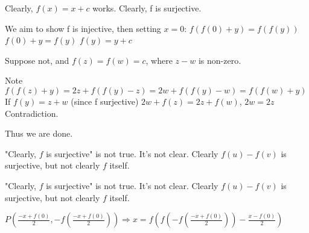 \begin{solution}
	Clearly, $f(x)=x+c$ works.
Clearly, f is surjective.

We aim to show f is injective, then setting $x=0$:
$f(f(0)+y)=f(f(y))$
$f(0)+y=f(y)$
$f(y)=y+c$

Suppose not, and $f(z)=f(w)=c$, where $z-w$ is non-zero.

Note $f(f(z)+y)=2z+f(f(y)-z)=2w+f(f(y)-w)=f(f(w)+y)$
If $f(y)=z+w$ (since f surjective)
$2w+f(z)=2z+f(w)$,
$2w=2z$
Contradiction.

Thus we are done.
\end{solution}



\begin{solution}
	"Clearly, $f$ is surjective" is not true.  It's not clear.  Clearly $f(u)-f(v)$ is surjective, but not clearly $f$ itself.
\end{solution}



\begin{solution}
	\begin{tcolorbox}"Clearly, $f$ is surjective" is not true.  It's not clear.  Clearly $f(u)-f(v)$ is surjective, but not clearly $f$ itself.\end{tcolorbox}

$P(\frac{-x+f(0)}{2},-f(\frac{-x+f(0)}{2}))\Rightarrow x=f(f(-f(\frac{-x+f(0)}{2}))-\frac{x-f(0)}{2})$
\end{solution}






